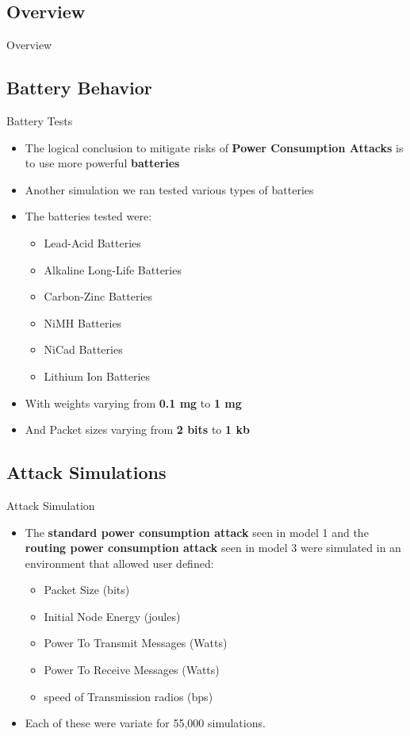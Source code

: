 \documentclass{beamer}
\begin{document}
\subsection{Overview}
\begin{frame}{Overview}
\end{frame}
\subsection{Battery Behavior}

\begin{frame}{Battery Tests}
\begin{itemize}
	\item The logical conclusion to mitigate risks of \textbf{Power Consumption Attacks} is to use more powerful \textbf{batteries}
	\item Another simulation we ran tested various types of batteries
	\item The batteries tested were: 
	\begin{itemize}
	  \item Lead-Acid Batteries
	  \item Alkaline Long-Life Batteries
	  \item Carbon-Zinc Batteries
	  \item NiMH Batteries
	  \item NiCad Batteries
	  \item Lithium Ion Batteries
	\end{itemize}
	\item With weights varying from \textbf{0.1 mg} to \textbf{1 mg}
	\item And Packet sizes varying from \textbf{2 bits} to \textbf{1 kb}
\end{itemize}
\end{frame}

\subsection{Attack Simulations}

\begin{frame}{Attack Simulation}
	\begin{itemize}
	\item The \textbf{standard power consumption attack} seen in model 1 and the \textbf{routing power consumption attack} seen in model 3 were simulated in an environment that allowed user defined: 
	\begin{itemize}
		\item Packet Size (bits)
		\item Initial Node Energy (joules)
		\item Power To Transmit Messages (Watts)
		\item Power To Receive Messages (Watts)
		\item speed of Transmission radios (bps)
	\end{itemize}
	\item Each of these were variate for 55,000 simulations.
	
	\end{itemize}
\end{frame}
\end{document}

